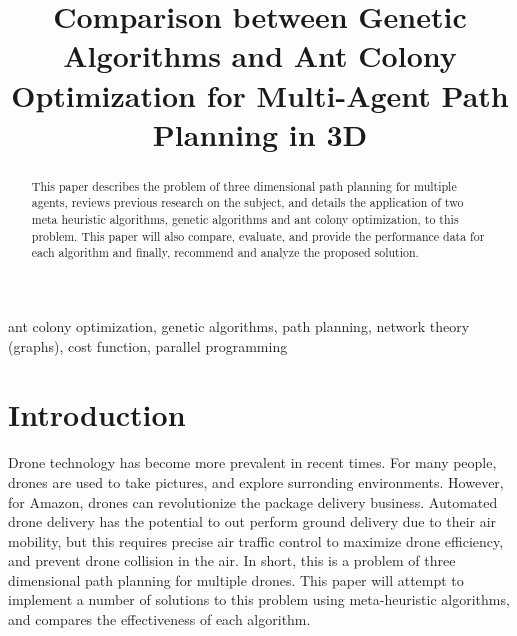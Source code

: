 \documentclass[conference]{IEEEtran}
\begin{document}
\title{Comparison between Genetic Algorithms and Ant Colony Optimization for Multi-Agent Path Planning in 3D}

\author{
\and
{}
\and
{}
\and
{}
\and
{}
\and
{}
}

\maketitle

\begin{abstract}
This paper describes the problem of three dimensional path planning for multiple agents, reviews previous research on the subject, and details the application of two meta heuristic algorithms, genetic algorithms and ant colony optimization, to this problem. This paper will also compare, evaluate, and provide the performance data for each algorithm and finally, recommend and analyze the proposed solution.
\end{abstract}

\begin{IEEEkeywords}
ant colony optimization, genetic algorithms, path planning, network theory (graphs), cost function, parallel programming
\end{IEEEkeywords}

\section{Introduction}
Drone technology has become more prevalent in recent times. For many people, drones are used to take pictures, and explore surronding environments. However, for Amazon, drones can revolutionize the package delivery business. Automated drone delivery has the potential to out perform ground delivery due to their air mobility, but this requires precise air traffic control to maximize drone efficiency, and prevent drone collision in the air. In short, this is a problem of three dimensional path planning for multiple drones. This paper will attempt to implement a number of solutions to this problem using meta-heuristic algorithms, and compares the effectiveness of each algorithm.
\end{document}
